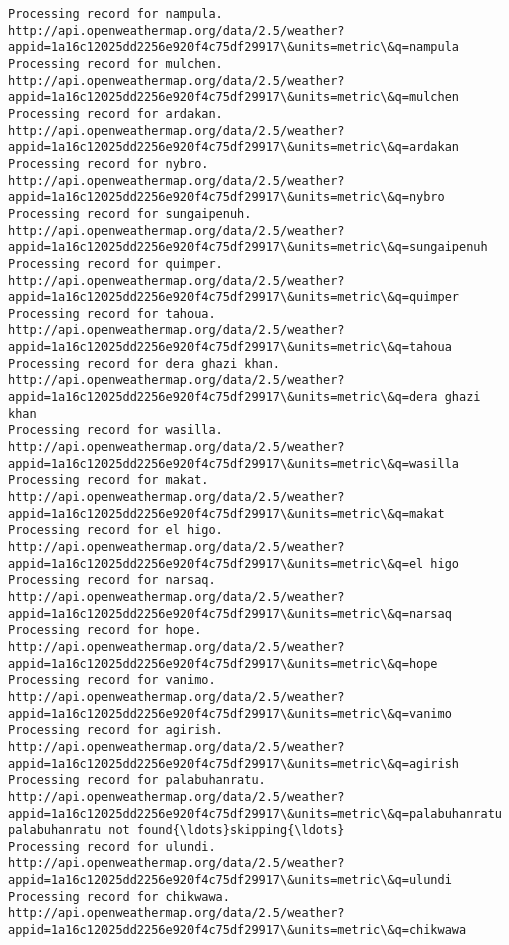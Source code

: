\documentclass[11pt]{article}
\begin{document}
\begin{Verbatim}[commandchars=\\\{\}]
Processing record for nampula.
http://api.openweathermap.org/data/2.5/weather?appid=1a16c12025dd2256e920f4c75df29917\&units=metric\&q=nampula
Processing record for mulchen.
http://api.openweathermap.org/data/2.5/weather?appid=1a16c12025dd2256e920f4c75df29917\&units=metric\&q=mulchen
Processing record for ardakan.
http://api.openweathermap.org/data/2.5/weather?appid=1a16c12025dd2256e920f4c75df29917\&units=metric\&q=ardakan
Processing record for nybro.
http://api.openweathermap.org/data/2.5/weather?appid=1a16c12025dd2256e920f4c75df29917\&units=metric\&q=nybro
Processing record for sungaipenuh.
http://api.openweathermap.org/data/2.5/weather?appid=1a16c12025dd2256e920f4c75df29917\&units=metric\&q=sungaipenuh
Processing record for quimper.
http://api.openweathermap.org/data/2.5/weather?appid=1a16c12025dd2256e920f4c75df29917\&units=metric\&q=quimper
Processing record for tahoua.
http://api.openweathermap.org/data/2.5/weather?appid=1a16c12025dd2256e920f4c75df29917\&units=metric\&q=tahoua
Processing record for dera ghazi khan.
http://api.openweathermap.org/data/2.5/weather?appid=1a16c12025dd2256e920f4c75df29917\&units=metric\&q=dera ghazi khan
Processing record for wasilla.
http://api.openweathermap.org/data/2.5/weather?appid=1a16c12025dd2256e920f4c75df29917\&units=metric\&q=wasilla
Processing record for makat.
http://api.openweathermap.org/data/2.5/weather?appid=1a16c12025dd2256e920f4c75df29917\&units=metric\&q=makat
Processing record for el higo.
http://api.openweathermap.org/data/2.5/weather?appid=1a16c12025dd2256e920f4c75df29917\&units=metric\&q=el higo
Processing record for narsaq.
http://api.openweathermap.org/data/2.5/weather?appid=1a16c12025dd2256e920f4c75df29917\&units=metric\&q=narsaq
Processing record for hope.
http://api.openweathermap.org/data/2.5/weather?appid=1a16c12025dd2256e920f4c75df29917\&units=metric\&q=hope
Processing record for vanimo.
http://api.openweathermap.org/data/2.5/weather?appid=1a16c12025dd2256e920f4c75df29917\&units=metric\&q=vanimo
Processing record for agirish.
http://api.openweathermap.org/data/2.5/weather?appid=1a16c12025dd2256e920f4c75df29917\&units=metric\&q=agirish
Processing record for palabuhanratu.
http://api.openweathermap.org/data/2.5/weather?appid=1a16c12025dd2256e920f4c75df29917\&units=metric\&q=palabuhanratu
palabuhanratu not found{\ldots}skipping{\ldots}
Processing record for ulundi.
http://api.openweathermap.org/data/2.5/weather?appid=1a16c12025dd2256e920f4c75df29917\&units=metric\&q=ulundi
Processing record for chikwawa.
http://api.openweathermap.org/data/2.5/weather?appid=1a16c12025dd2256e920f4c75df29917\&units=metric\&q=chikwawa

\end{Verbatim}
\end{document}
